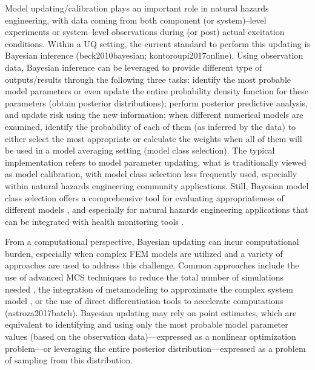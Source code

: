 Model updating/calibration plays an important role in natural hazards engineering, with data coming from both component (or system)–level experiments or system–level observations during (or post) actual excitation conditions. Within a UQ setting, the current standard to perform this updating is Bayesian inference (beck2010bayesian; kontoroupi2017online). Using observation data, Bayesian inference can be leveraged to provide different type of outputs/results \citep{beck2013prior} through the following three tasks: identify the most probable model parameters or even update the entire probability density function for these parameters (obtain posterior distributions); perform posterior predictive analysis, and update risk using the new information; when different numerical models are examined, identify the probability of each of them (as inferred by the data) to either select the most appropriate or calculate the weights when all of them will be used in a model averaging setting (model class selection). The typical implementation refers to model parameter updating, what is traditionally viewed as model calibration, with model class selection less frequently used, especially within natural hazards engineering community applications. Still, Bayesian model class selection offers a comprehensive tool for evaluating appropriateness of different models \citep{muto2008bayesian}, and especially for natural hazards engineering applications that can be integrated with health monitoring tools \citep{oh2018bayesian}.

From a computational perspective, Bayesian updating can incur computational burden, especially when complex FEM models are utilized and a variety of approaches are used to address this challenge. Common approaches include the use of advanced MCS techniques to reduce the total number of simulations needed \citep{quiroz2018speeding}, the integration of metamodeling to approximate the complex system model \citep{angelikopoulos2015xtmcmc}, or the use of direct differentiation tools to accelerate computations (astroza2017batch). Bayesian updating may rely on point estimates, which are equivalent to identifying and using only the most probable  model parameter values (based on the observation data)—expressed as a nonlinear optimization problem—or leveraging the entire posterior distribution—expressed as a problem of sampling from this distribution.


